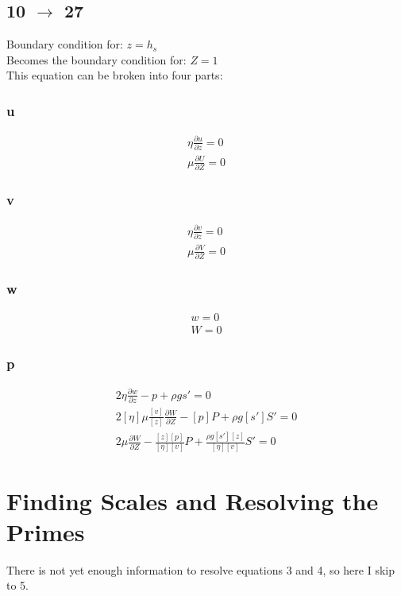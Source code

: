 \documentclass[10pt, letterpaper, twoside]{article}
\newcommand{\pd}[2]{\frac{\partial#1}{\partial#2}}
\begin{document}
	\subsection{10 $ \rightarrow $ 27}
	Boundary condition for: $ z = h_s $\\
	Becomes the boundary condition for: $ Z = 1 $\\
	This equation can be broken into four parts:
	\subsubsection{u}
	\begin{gather*}
		\eta\pd{u}{z} = 0 \tag{10a} \\
		\mu\pd{U}{Z} = 0 \tag{27a}
	\end{gather*}
	\subsubsection{v}
	\begin{gather*}
		\eta\pd{v}{z} = 0 \tag{10b} \\
		\mu\pd{V}{Z} = 0 \tag{27b}
	\end{gather*}
	\subsubsection{w}
	\begin{gather*}
		w = 0 \tag{10c} \\
		W = 0 \tag{27c}
	\end{gather*}
	\subsubsection{p}
	\begin{gather*}
		2\eta\pd{w}{z} - p + \rho g s' = 0 \tag{10d} \\
		2\left[\eta\right]\mu\frac{\left[v\right]}{\left[z\right]}\pd{W}{Z} - \left[p\right]P + \rho g\left[s'\right]S' = 0\\
		2\mu\pd{W}{Z} - \frac{\left[z\right]\left[p\right]}{\left[\eta\right]\left[v\right]}P + \frac{\rho g \left[s'\right]\left[z\right]}{\left[\eta\right]\left[v\right]}S' = 0 \tag{10d'}
	\end{gather*}
	
	\section{Finding Scales and Resolving the Primes}
	There is not yet enough information to resolve equations 3 and 4, so here I skip to 5.
\end{document}
